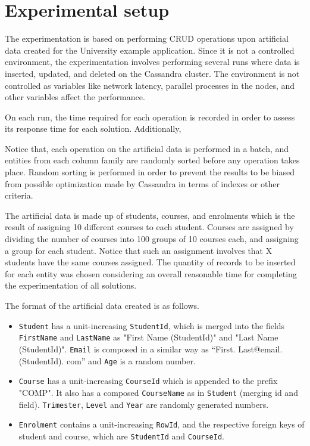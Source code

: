 \section{Experimental setup}\label{sexp:ExperimentalSetup}

The experimentation is based on performing \ac{CRUD} operations upon artificial
data created for the University example application. Since it is not a
controlled environment, the experimentation involves performing several runs
where data is inserted, updated, and deleted on the Cassandra cluster. The
environment is not controlled as variables like network latency, parallel
processes in the nodes, and other variables affect the performance.

On each run,  the time required for each operation is recorded in order to assess
its response time for each solution. Additionally,  

 Notice that, each operation on the
artificial data is performed in a batch,   and entities from each column family
are randomly sorted before any operation takes place.  Random sorting is performed in order to
prevent the results to be biased from possible optimization made by Cassandra in
terms of indexes or other criteria. 
		
The artificial data is made up of  students,   courses,  and 
enrolments which is the result of assigning 10 different courses to each
student.  Courses are assigned by dividing the number of courses
into 100 groups of 10 courses each,  and assigning a group for each student. 
Notice that such an assignment involves that X students have the same courses
assigned.  The quantity of records to be inserted for each entity was chosen
considering an overall reasonable time for completing the experimentation of all
solutions. 
		
The format of the artificial data created is as follows.  
	\begin{itemize}
	  
		  \item \texttt{Student} has a
		unit-increasing \texttt{StudentId},  which is merged into the fields \texttt{FirstName}
		 and \texttt{LastName} as "First Name (StudentId)" and "Last Name
		(StudentId)".  \texttt{Email} is composed in a similar way as
		``First. Last@email. (StudentId). com'' and \texttt{Age} is a random number. 
		
		\item  \texttt{Course} has a unit-increasing \texttt{CourseId} which is
		appended to the prefix "COMP".  It also has a composed \texttt{CourseName} as
		in \texttt{Student} (merging id and field).  \texttt{Trimester},  \texttt{Level}
		and \texttt{Year} are randomly generated numbers. 
		
		\item  \texttt{Enrolment} contains a unit-increasing \texttt{RowId},  and the
		respective foreign keys of student and course,  which are \texttt{StudentId}
		and \texttt{CourseId}. 
		
	\end{itemize}

